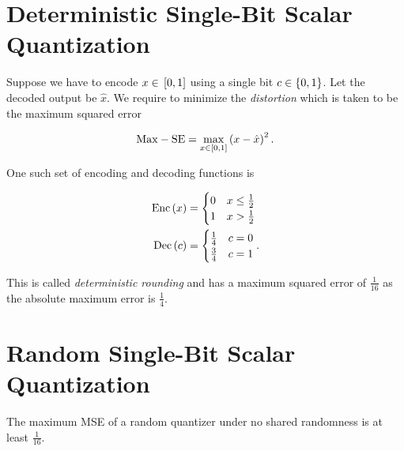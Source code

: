 \documentclass[twoside]{article}
\begin{document}



\section{Deterministic Single-Bit Scalar Quantization}

Suppose we have to encode \(x\in{}\left[0,1\right]\) using a single bit \(c\in\left\{0,1\right\}\). Let the decoded output be \(\hat{x}\). We require to minimize the \emph{distortion} which is taken to be the maximum squared error

\begin{equation}
    \mathrm{Max-SE} = \max_{x\in{}\left[0,1\right]}\left(x-\hat{x}\right)^2.
    \label{eq:max-se}
\end{equation}

One such set of encoding and decoding functions is

\begin{align}
    \mathrm{Enc}\left(x\right) &= 
    \begin{cases}
        0 & x \le \frac{1}{2} \\
        1 & x > \frac{1}{2}
    \end{cases}
    \label{eq:det-rd-enc} \\
    \mathrm{Dec}\left(c\right) &= 
    \begin{cases}
        \frac{1}{4} & c = 0 \\
        \frac{3}{4} & c = 1
    \end{cases}.
    \label{eq:det-rd-dec}
\end{align}

This is called \emph{deterministic rounding} and has a maximum squared error of \(\frac{1}{16}\) as the absolute maximum error is \(\frac{1}{4}\).

\section{Random Single-Bit Scalar Quantization}

\begin{claim}
    The maximum MSE of a random quantizer under no shared randomness is at least \(\frac{1}{16}\).
\end{claim}
\end{document}
